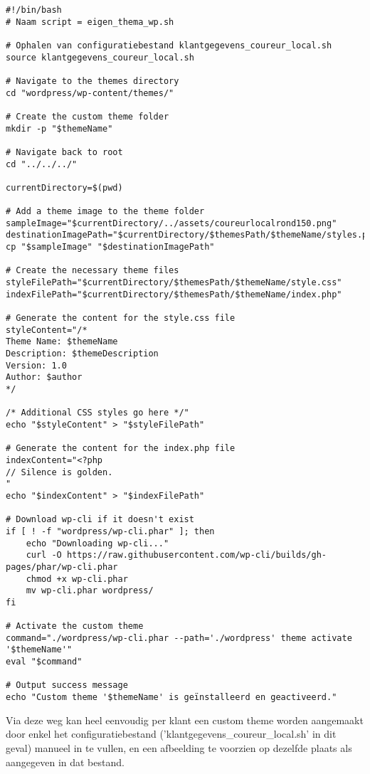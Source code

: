 \begin{verbatim}
#!/bin/bash
# Naam script = eigen_thema_wp.sh

# Ophalen van configuratiebestand klantgegevens_coureur_local.sh
source klantgegevens_coureur_local.sh

# Navigate to the themes directory
cd "wordpress/wp-content/themes/"

# Create the custom theme folder
mkdir -p "$themeName"

# Navigate back to root
cd "../../../"

currentDirectory=$(pwd)

# Add a theme image to the theme folder
sampleImage="$currentDirectory/../assets/coureurlocalrond150.png"
destinationImagePath="$currentDirectory/$themesPath/$themeName/styles.png"
cp "$sampleImage" "$destinationImagePath"

# Create the necessary theme files
styleFilePath="$currentDirectory/$themesPath/$themeName/style.css"
indexFilePath="$currentDirectory/$themesPath/$themeName/index.php"

# Generate the content for the style.css file
styleContent="/*
Theme Name: $themeName
Description: $themeDescription
Version: 1.0
Author: $author
*/

/* Additional CSS styles go here */"
echo "$styleContent" > "$styleFilePath"

# Generate the content for the index.php file
indexContent="<?php
// Silence is golden.
"
echo "$indexContent" > "$indexFilePath"

# Download wp-cli if it doesn't exist
if [ ! -f "wordpress/wp-cli.phar" ]; then
    echo "Downloading wp-cli..."
    curl -O https://raw.githubusercontent.com/wp-cli/builds/gh-pages/phar/wp-cli.phar
    chmod +x wp-cli.phar
    mv wp-cli.phar wordpress/
fi

# Activate the custom theme
command="./wordpress/wp-cli.phar --path='./wordpress' theme activate '$themeName'"
eval "$command"

# Output success message
echo "Custom theme '$themeName' is geïnstalleerd en geactiveerd."
\end{verbatim}
Via deze weg kan heel eenvoudig per klant een custom theme worden aangemaakt door enkel het configuratiebestand ('klantgegevens\_coureur\_local.sh' in dit geval) manueel in te vullen, en een afbeelding te voorzien op dezelfde plaats als aangegeven in dat bestand.

